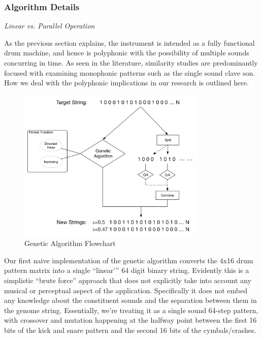 \subsubsection*{Algorithm Details}

\textit{Linear vs. Parallel Operation}

As the previous section explains, the instrument is intended as a fully functional drum machine, and hence is polyphonic with the possibility of multiple sounds concurring in time. As seen in the literature, similarity studies are predominantly focused with examining monophonic patterns such as the single sound clave son. How we deal with the polyphonic implications in our research is outlined here.

\begin{figure}
	\begin{center}
		\includegraphics[width=0.8\textwidth]{ch03_symbolic/figures/ga_algorithm.png}
	\end{center}
	\caption[Genetic Algorithm Flowchart]{Genetic Algorithm Flowchart}
	\label{fig:genetic}
\end{figure}

Our first naive implementation of the genetic algorithm converts the 4x16 drum pattern matrix into a single “linear'” 64 digit binary string. Evidently this is a simplistic ``brute force'' approach that does not explicitly take into account any musical or perceptual aspect of the application. Specifically it does not embed any knowledge about the constituent sounds and the separation between them in the genome string. Essentially, we’re treating it as a single sound 64-step pattern, with crossover and mutation happening at the halfway point between the first 16 bits of the kick and snare pattern and the second 16 bits of the cymbals/crashes. 

